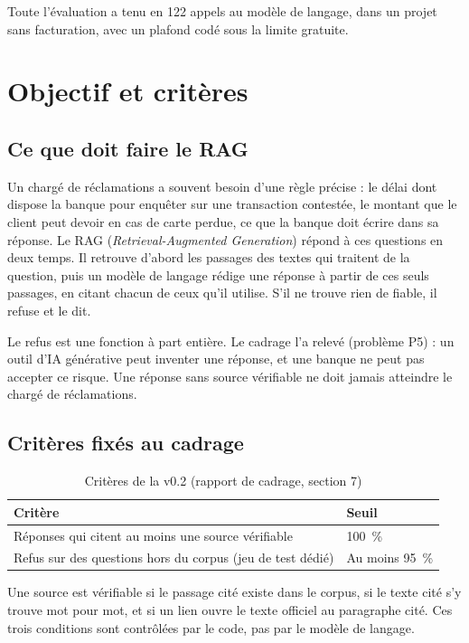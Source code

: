 \documentclass[11pt,a4paper]{article}
\begin{document}
Toute l'évaluation a tenu en 122 appels au modèle de langage, dans un projet sans facturation, avec un plafond codé sous la limite gratuite.

\setcounter{tocdepth}{1}
\tableofcontents
\newpage

\section{Objectif et critères}

\subsection{Ce que doit faire le RAG}

Un chargé de réclamations a souvent besoin d'une règle précise : le délai dont dispose la banque pour enquêter sur une transaction contestée, le montant que le client peut devoir en cas de carte perdue, ce que la banque doit écrire dans sa réponse. Le RAG (\emph{Retrieval-Augmented Generation}) répond à ces questions en deux temps. Il retrouve d'abord les passages des textes qui traitent de la question, puis un modèle de langage rédige une réponse à partir de ces seuls passages, en citant chacun de ceux qu'il utilise. S'il ne trouve rien de fiable, il refuse et le dit.

Le refus est une fonction à part entière. Le cadrage l'a relevé (problème P5) : un outil d'IA générative peut inventer une réponse, et une banque ne peut pas accepter ce risque. Une réponse sans source vérifiable ne doit jamais atteindre le chargé de réclamations.

\subsection{Critères fixés au cadrage}

\begin{table}[H]
\centering\small
\begin{tabularx}{\linewidth}{@{}Y l@{}}
\toprule
Critère & Seuil \\
\midrule
Réponses qui citent au moins une source vérifiable & 100~\% \\
Refus sur des questions hors du corpus (jeu de test dédié) & Au moins 95~\% \\
\bottomrule
\end{tabularx}
\caption{Critères de la v0.2 (rapport de cadrage, section 7)}
\end{table}

Une source est vérifiable si le passage cité existe dans le corpus, si le texte cité s'y trouve mot pour mot, et si un lien ouvre le texte officiel au paragraphe cité. Ces trois conditions sont contrôlées par le code, pas par le modèle de langage.
\end{document}
